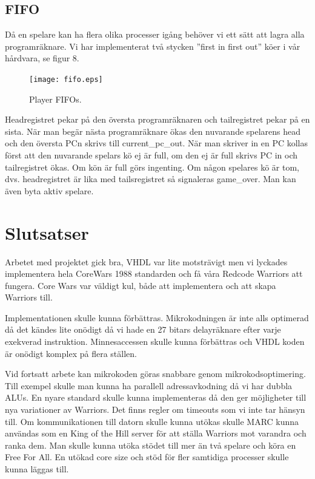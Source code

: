 \documentclass[11pt]{article}
\begin{document}
\newpage
\subsection{FIFO}

Då en spelare kan ha flera olika processer igång behöver vi ett sätt att lagra alla programräknare. Vi har implementerat två stycken ”first in first out” köer i vår hårdvara, se figur 8.

\begin{figure}[h]
    \begin{center}
        \texttt{[image: fifo.eps]}
        \caption{Player FIFOs.}
        \label{fig:fifo}
    \end{center}
\end{figure}

Headregistret pekar på den översta programräknaren och tailregistret pekar på en sista. När man begär nästa programräknare ökas den nuvarande spelarens head och den översta PCn skrivs till current\_pc\_out. När man skriver in en PC kollas först att den nuvarande spelars kö ej är full, om den ej är full skrivs PC in och tailregistret ökas. Om kön är full görs ingenting. Om någon spelares kö är tom, dvs. headregistret är lika med tailsregistret så signaleras game\_over. Man kan även byta aktiv spelare.


\newpage

\section{Slutsatser}

Arbetet med projektet gick bra, VHDL var lite motsträvigt men vi lyckades implementera hela CoreWars 1988 standarden och få våra Redcode Warriors att fungera. Core Wars var väldigt kul, både att implementera och att skapa Warriors till.

Implementationen skulle kunna förbättras. Mikrokodningen är inte alls optimerad då det kändes lite onödigt då vi hade en 27 bitars delayräknare efter varje exekverad instruktion. Minnesaccessen skulle kunna förbättras och VHDL koden är onödigt komplex på flera ställen.

Vid fortsatt arbete kan mikrokoden göras snabbare genom mikrokodsoptimering. Till exempel skulle man kunna ha parallell adressavkodning då vi har dubbla ALUs. En nyare standard skulle kunna implementeras då den ger möjligheter till nya variationer av Warriors. Det finns regler om timeouts som vi inte tar hänsyn till. Om kommunikationen till datorn skulle kunna utökas skulle MARC kunna användas som en King of the Hill server för att ställa Warriors mot varandra och ranka dem. Man skulle kunna utöka stödet till mer än två spelare och köra en Free For All. En utökad core size och stöd för fler samtidiga processer skulle kunna läggas till.
\end{document}
